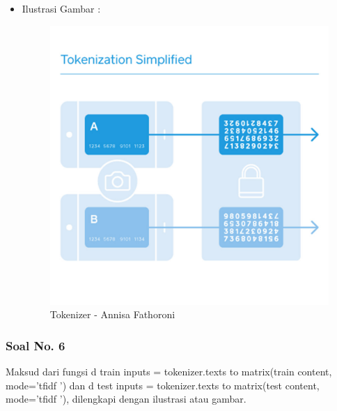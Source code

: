 \begin{itemize}
    \item Ilustrasi Gambar :

    \begin{figure}[!hbtp]
    \centering
    \includegraphics[scale=0.4]{figures/Chapter 7/1164067/Teori/Chapter7AnnisaFathoroni1.jpg}
    \caption{Tokenizer - Annisa Fathoroni}
    \label{Tokenizer - Annisa Fathoroni}
    \end{figure}
\end{itemize}

\subsubsection{Soal No. 6}
Maksud dari fungsi d train inputs = tokenizer.texts to matrix(train content, mode=’tfidf ’) dan d test inputs = tokenizer.texts to matrix(test content, mode=’tfidf ’), dilengkapi dengan ilustrasi atau gambar.


